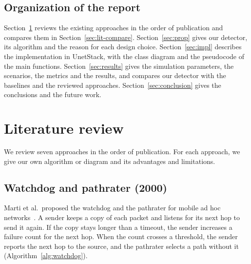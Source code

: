 \documentclass[11pt]{article}
\begin{document}
\subsection{Organization of the report}\label{sec:organization}
\noindent
Section~\ref{sec:lit} reviews the existing approaches in the order of publication and compares them in Section~\ref{sec:lit-compare}.
Section~\ref{sec:prop} gives our detector, its algorithm and the reason for each design choice.
Section~\ref{sec:impl} describes the implementation in UnetStack, with the class diagram and the pseudocode of the main functions.
Section~\ref{sec:results} gives the simulation parameters, the scenarios, the metrics and the results, and compares our detector with the baselines and the reviewed approaches.
Section~\ref{sec:conclusion} gives the conclusions and the future work.

\section{Literature review}\label{sec:lit}
\noindent
We review seven approaches in the order of publication.
For each approach, we give our own algorithm or diagram and its advantages and limitations.

\subsection{Watchdog and pathrater (2000)}\label{sec:lit-watchdog}
\noindent
Marti et al.\ proposed the watchdog and the pathrater for mobile ad hoc networks~\cite{marti2000}.
A sender keeps a copy of each packet and listens for its next hop to send it again.
If the copy stays longer than a timeout, the sender increases a failure count for the next hop.
When the count crosses a threshold, the sender reports the next hop to the source, and the pathrater selects a path without it (Algorithm~\ref{alg:watchdog}).
\end{document}

